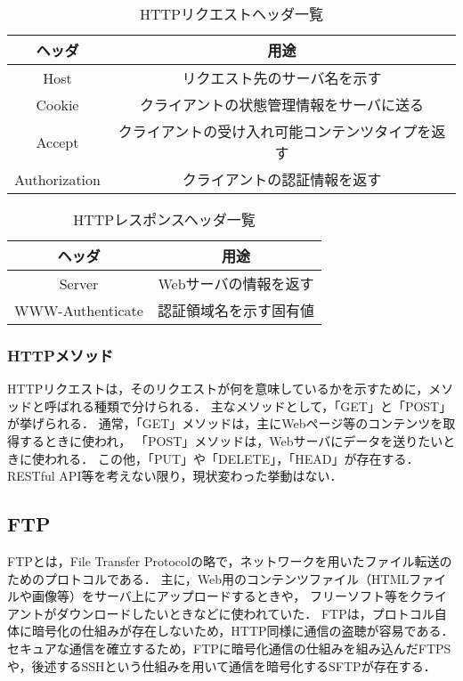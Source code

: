 \begin{table}[htbp]
    \centering
    \caption{HTTPリクエストヘッダ一覧}
    \label{tab:reqheader}
    \begin{tabular}{c|c} \hline
        ヘッダ & 用途 \\ \hline
        Host & リクエスト先のサーバ名を示す \\ \hline
        Cookie & クライアントの状態管理情報をサーバに送る \\ \hline
        Accept & クライアントの受け入れ可能コンテンツタイプを返す \\ \hline
        Authorization & クライアントの認証情報を返す \\ \hline
    \end{tabular}
\end{table}
\begin{table}[htbp]
    \centering
    \caption{HTTPレスポンスヘッダ一覧}
    \label{tab:resheader}
    \begin{tabular}{c|c} \hline
        ヘッダ & 用途 \\ \hline
        Server & Webサーバの情報を返す \\ \hline
        WWW-Authenticate & 認証領域名を示す固有値 \\ \hline
    \end{tabular}
\end{table}


\subsubsection{HTTPメソッド}
HTTPリクエストは，そのリクエストが何を意味しているかを示すために，メソッドと呼ばれる種類で分けられる．
主なメソッドとして，「GET」と「POST」が挙げられる．
通常，「GET」メソッドは，主にWebページ等のコンテンツを取得するときに使われ，
「POST」メソッドは，Webサーバにデータを送りたいときに使われる．
この他，「PUT」や「DELETE」，「HEAD」が存在する．
RESTful API等を考えない限り，現状変わった挙動はない．

\subsection{FTP}
FTPとは，File Transfer Protocolの略で，ネットワークを用いたファイル転送のためのプロトコルである．
主に，Web用のコンテンツファイル（HTMLファイルや画像等）をサーバ上にアップロードするときや，
フリーソフト等をクライアントがダウンロードしたいときなどに使われていた．
FTPは，プロトコル自体に暗号化の仕組みが存在しないため，HTTP同様に通信の盗聴が容易である．
セキュアな通信を確立するため，FTPに暗号化通信の仕組みを組み込んだFTPSや，後述するSSHという仕組みを用いて通信を暗号化するSFTPが存在する．

